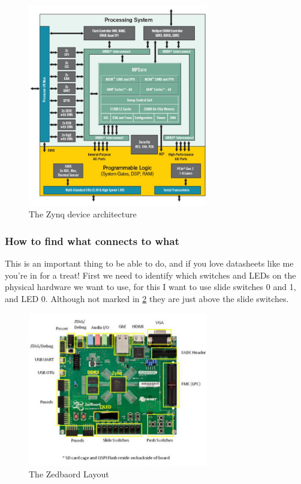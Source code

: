 {\begin{figure}[H]
    \begin{center}
        \includegraphics[width=0.7\textwidth]{./src/zynq_arch.jpg}
        \caption{The Zynq device architecture}
        \label{fig:zynq}
    \end{center}
\end{figure}

\subsubsection{How to find what connects to what}
This is an important thing to be able to do, and if you love datasheets like me you're in for a treat! First we need to identify which switches and LEDs on the physical hardware we want to use, for this I want to use slide switches 0 and 1, and LED 0. Although not marked in \cref{fig:zedoverlay} they are just above the slide switches.


\begin{figure}[H]
    \begin{center}
        \includegraphics[width=0.7\textwidth]{./src/Zedboard_Overlay.jpg}
        \caption{The Zedbaord Layout}
        \label{fig:zedoverlay}
    \end{center}
\end{figure}

}
